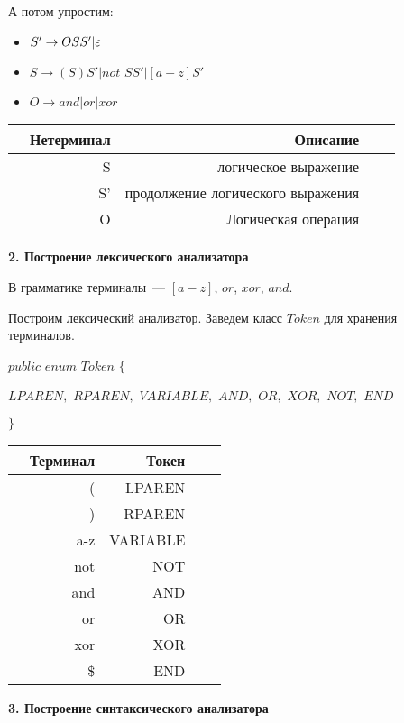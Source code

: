 \documentclass[11pt,a4paper,oneside]{article}
\begin{document}
А потом упростим:

\begin{itemize}
  \item $S' \rightarrow OSS'|\varepsilon$
  \item $S \rightarrow (S)S'|not$ $SS'|[a-z]S'$
	\item $O \rightarrow and|or|xor$
\end{itemize}

\begin{tabular}{|c||r|rrr||}
\hline
 & Нетерминал & Описание \\
\hline
\hline
 & S & логическое выражение  \\
 & S' & продолжение логического выражения \\
 & O & Логическая операция \\
\hline
\end{tabular}
\newline

\textbf{2. Построение лексического анализатора}
\newline                    
\newline

В грамматике терминалы~--- $[a-z]$, $or$, $xor$, $and$.

Построим лексический анализатор. Заведем класс $Token$ для хранения терминалов.

$public$ $enum$ $Token$ $\{$

    $LPAREN,$ $RPAREN,$ $VARIABLE,$ $AND,$ $OR,$ $XOR,$ $NOT,$ $END$

$\}$

\begin{tabular}{|c||r|rrr|}
\hline
 & Терминал & Токен \\
\hline
\hline
 & ( & LPAREN  \\
 & ) & RPAREN \\
 & a-z & VARIABLE \\
 & not & NOT \\
 & and & AND \\
 & or & OR \\
 & xor & XOR \\
 & \$ & END \\
\hline
\end{tabular}
\newline

\textbf{3. Построение синтаксического анализатора}
\newline                    
\newline
\end{document}
